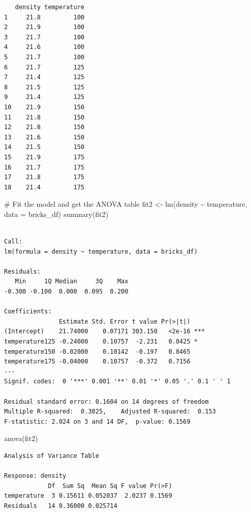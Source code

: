 \documentclass[
  letterpaper,
]{scrbook}
\newenvironment{Shaded}{\begin{snugshade}}{\end{snugshade}}
\newcommand{\AttributeTok}[1]{\textcolor[rgb]{0.40,0.45,0.13}{#1}}
\newcommand{\CommentTok}[1]{\textcolor[rgb]{0.37,0.37,0.37}{#1}}
\newcommand{\FunctionTok}[1]{\textcolor[rgb]{0.28,0.35,0.67}{#1}}
\newcommand{\NormalTok}[1]{\textcolor[rgb]{0.00,0.23,0.31}{#1}}
\newcommand{\OtherTok}[1]{\textcolor[rgb]{0.00,0.23,0.31}{#1}}
\newcommand{\SpecialCharTok}[1]{\textcolor[rgb]{0.37,0.37,0.37}{#1}}
\begin{document}
\begin{verbatim}
   density temperature
1     21.8         100
2     21.9         100
3     21.7         100
4     21.6         100
5     21.7         100
6     21.7         125
7     21.4         125
8     21.5         125
9     21.4         125
10    21.9         150
11    21.8         150
12    21.8         150
13    21.6         150
14    21.5         150
15    21.9         175
16    21.7         175
17    21.8         175
18    21.4         175
\end{verbatim}

\begin{Shaded}
\begin{Highlighting}[]
\CommentTok{\# Fit the model and get the ANOVA table}
\NormalTok{fit2 }\OtherTok{\textless{}{-}} \FunctionTok{lm}\NormalTok{(density }\SpecialCharTok{\textasciitilde{}}\NormalTok{ temperature, }\AttributeTok{data =}\NormalTok{ bricks\_df)}
\FunctionTok{summary}\NormalTok{(fit2)}
\end{Highlighting}
\end{Shaded}

\begin{verbatim}

Call:
lm(formula = density ~ temperature, data = bricks_df)

Residuals:
   Min     1Q Median     3Q    Max 
-0.300 -0.100  0.000  0.095  0.200 

Coefficients:
               Estimate Std. Error t value Pr(>|t|)    
(Intercept)    21.74000    0.07171 303.150   <2e-16 ***
temperature125 -0.24000    0.10757  -2.231   0.0425 *  
temperature150 -0.02000    0.10142  -0.197   0.8465    
temperature175 -0.04000    0.10757  -0.372   0.7156    
---
Signif. codes:  0 '***' 0.001 '**' 0.01 '*' 0.05 '.' 0.1 ' ' 1

Residual standard error: 0.1604 on 14 degrees of freedom
Multiple R-squared:  0.3025,    Adjusted R-squared:  0.153 
F-statistic: 2.024 on 3 and 14 DF,  p-value: 0.1569
\end{verbatim}

\begin{Shaded}
\begin{Highlighting}[]
\FunctionTok{anova}\NormalTok{(fit2)}
\end{Highlighting}
\end{Shaded}

\begin{verbatim}
Analysis of Variance Table

Response: density
            Df  Sum Sq  Mean Sq F value Pr(>F)
temperature  3 0.15611 0.052037  2.0237 0.1569
Residuals   14 0.36000 0.025714               
\end{verbatim}
\end{document}

